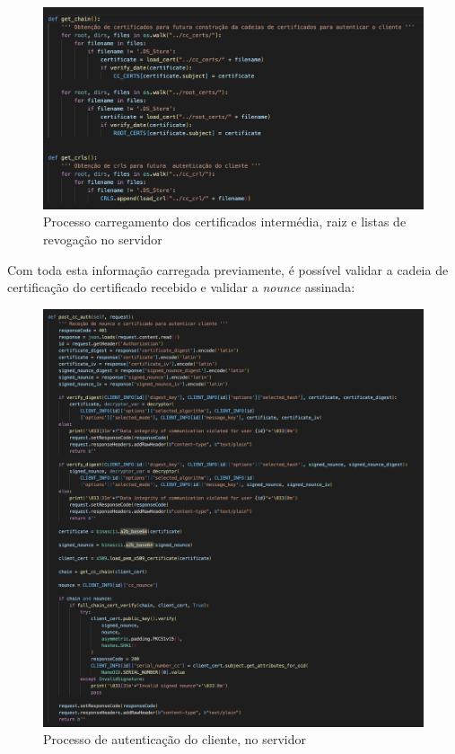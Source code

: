 \documentclass[10pt,english]{article}
\begin{document}
\begin{figure}[!h]
        \centering
        \includegraphics[width=\textwidth]{images/get_chain_get_crl.png}
        \caption{Processo carregamento dos certificados intermédia, raiz e listas de revogação no servidor}
\end{figure}

\clearpage

\par Com toda esta informação carregada previamente, é possível validar a cadeia de certificação do certificado recebido e validar a \textit{nounce} assinada:

\begin{figure}[!h]
        \centering
        \includegraphics[width=\textwidth]{images/post_cc_auth_server.png}
        \caption{Processo de autenticação do cliente, no servidor}
\end{figure}
\end{document}

